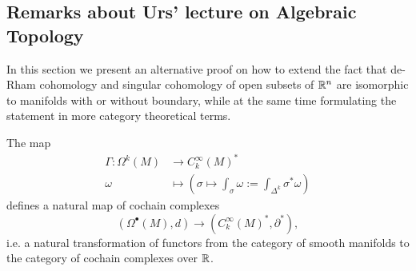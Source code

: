 \subsection{Remarks about Urs' lecture on Algebraic Topology}

In this section we present an alternative proof on how to extend the fact that de-Rham cohomology and singular cohomology of open subsets of $\mathbb{R}^n$ are isomorphic to manifolds with or without boundary, while at the same time formulating the statement in more category theoretical terms.

    \begin{lemma}
        \label{lem:natural_cochain_map1}
      The map
      \begin{align*}
        \Gamma \colon \Omega^k(M) & \to C_k^\infty(M)^\ast \\
        \omega &\mapsto (\sigma \mapsto \int_\sigma\omega := \int_{\Delta^k}\sigma^\ast\omega)
      \end{align*}
      defines a natural map of cochain complexes
      \[
      (\Omega^\bullet(M),d) \to (C_k^\infty(M)^\ast,\partial^\ast),
      \]
      i.e. a natural transformation of functors from the category of smooth manifolds to the category of cochain complexes over $\mathbb{R}$.
    \end{lemma}
